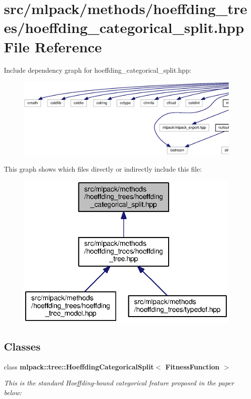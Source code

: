 \section{src/mlpack/methods/hoeffding\+\_\+trees/hoeffding\+\_\+categorical\+\_\+split.hpp File Reference}
\label{hoeffding__categorical__split_8hpp}
Include dependency graph for hoeffding\+\_\+categorical\+\_\+split.\+hpp\+:
\nopagebreak
\begin{figure}[H]
\begin{center}
\leavevmode
\includegraphics[width=350pt]{hoeffding__categorical__split_8hpp__incl}
\end{center}
\end{figure}
This graph shows which files directly or indirectly include this file\+:
\nopagebreak
\begin{figure}[H]
\begin{center}
\leavevmode
\includegraphics[width=332pt]{hoeffding__categorical__split_8hpp__dep__incl}
\end{center}
\end{figure}
\subsection*{Classes}
\begin{DoxyCompactItemize}
\item 
class {\bf mlpack\+::tree\+::\+Hoeffding\+Categorical\+Split$<$ Fitness\+Function $>$}
\begin{DoxyCompactList}\small\item\em This is the standard Hoeffding-\/bound categorical feature proposed in the paper below\+: \end{DoxyCompactList}\end{DoxyCompactItemize}
